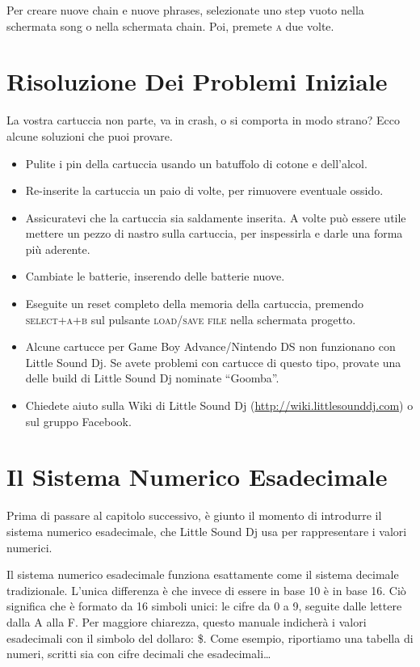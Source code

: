 Per creare nuove chain e nuove phrases, selezionate uno step vuoto nella schermata song o nella schermata chain. Poi, premete \textsc{a} due volte.

\section{Risoluzione Dei Problemi Iniziale}

La vostra cartuccia non parte, va in crash, o si comporta in modo strano? Ecco alcune soluzioni che puoi provare.

\begin{itemize}
\item Pulite i pin della cartuccia usando un batuffolo di cotone e dell'alcol.
\item Re-inserite la cartuccia un paio di volte, per rimuovere eventuale ossido.
\item Assicuratevi che la cartuccia sia saldamente inserita. A volte può essere utile mettere un pezzo di nastro sulla cartuccia, per inspessirla e darle una forma più aderente.
\item Cambiate le batterie, inserendo delle batterie nuove.
\item Eseguite un reset completo della memoria della cartuccia, premendo \textsc{select+a+b} sul pulsante \textsc{load/save file} nella schermata progetto.
\item Alcune cartucce per Game Boy Advance/Nintendo DS non funzionano con Little Sound Dj. Se avete problemi con cartucce di questo tipo, provate una delle build di Little Sound Dj nominate ``Goomba''.
\item Chiedete aiuto sulla Wiki di Little Sound Dj (\url{http://wiki.littlesounddj.com}) o sul gruppo Facebook.
\end{itemize}

\section{Il Sistema Numerico Esadecimale}

Prima di passare al capitolo successivo, è giunto il momento di introdurre il sistema numerico esadecimale, che Little Sound Dj usa per rappresentare i valori numerici. 

Il sistema numerico esadecimale funziona esattamente come il sistema decimale
tradizionale. L'unica differenza è che invece di essere in base 10 è in base 16. Ciò significa
che è formato da 16 simboli unici: le cifre da 0 a 9, seguite dalle lettere dalla A alla F. Per
maggiore chiarezza, questo manuale indicherà i valori esadecimali con il simbolo del dollaro: \$. Come
esempio, riportiamo una tabella di numeri, scritti sia con cifre decimali che esadecimali\ldots

